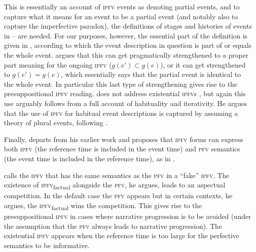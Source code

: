\documentclass[output=paper]{langscibook}
\begin{document}

\noindent This is essentially an account of \textsc{ipfv} events as denoting partial events, and to capture what it means for an event to be a partial event (and notably also to capture the imperfective paradox), the definitions of stages and histories of events in -- are needed. For our purposes, however, the essential part of the definition is given in , according to which the event description in question is part of or equals the whole event. \citeauthor{altshuler14} argues that this can get pragmatically strengthened to a proper part meaning for the ongoing \textsc{ipfv} ($g(e') \subset g(e)$), or it can get strengthened to $g(e') = g(e)$, which essentially says that the partial event is identical to the whole event. In particular this last type of strengthening gives rise to the presuppositional \textsc{ipfv} reading. \citeauthor{altshuler14} does not address existential \textsc{ipfv}s \citep[but see][]{altshuler12}, but again this use arguably follows from a full account of habituality and iterativity. He argues that the use of \textsc{ipfv} for habitual event descriptions is captured by assuming a theory of plural events, following \citet{ferreira05}.     

Finally, \citet{gronn15} departs from his earlier work and proposes that \textsc{ipfv} forms can express both \textsc{ipfv} (the reference time is included in the event time) and \textsc{pfv} semantics (the event time is included in the reference time), as in .

\ea\label{gehr:ex:gronn15PFIPF} 
\label{gehr:ex:fakeipf}
\z	
\z

\noindent \citeauthor{gronn15} calls the \textsc{ipfv} that has the same semantics as the \textsc{pfv} in  a ``fake'' \textsc{ipfv}. The existence of \textsc{ipfv}\textsubscript{factual} alongside the \textsc{pfv}, he argues, leads to an aspectual competition. In the default case the \textsc{pfv} appears but in certain contexts, he argues, the \textsc{ipfv}\textsubscript{factual} wins the competition. This gives rise to the presuppositional \textsc{ipfv} in cases where narrative progression is to be avoided (under the assumption that the \textsc{pfv} always leads to narrative progression). The existential \textsc{ipfv} appears when the reference time is too large for the perfective semantics to be informative. 
\end{document}
